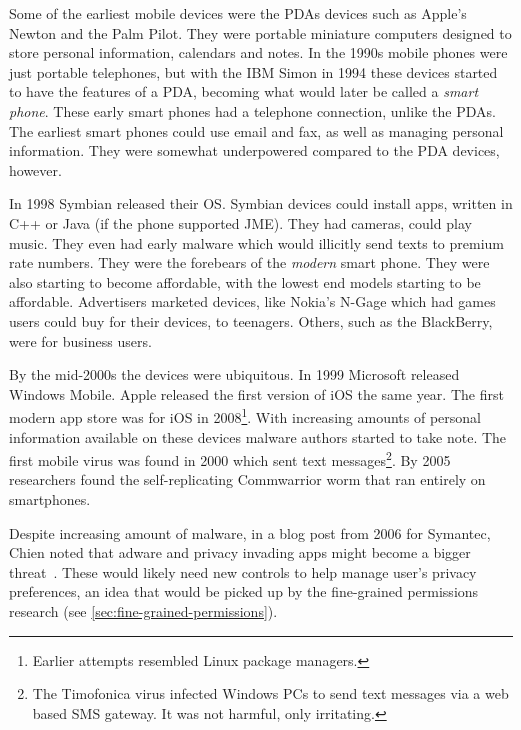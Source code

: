 \documentclass[thesis.tex]{subfiles}
\begin{document}
Some of the earliest mobile devices were the \acp{PDA} devices such as Apple's
Newton and the Palm Pilot. They were portable miniature computers designed to
store personal information, calendars and notes.  In the 1990s mobile phones were just portable
telephones, but with the IBM Simon in 1994 these devices started to have the features of a \ac{PDA}, becoming what would later be called a
\emph{smart phone}. These early smart phones had a telephone connection, unlike
the \acp{PDA}. The earliest smart phones could use email and fax, as well as
managing personal information. They were somewhat underpowered compared to the
\ac{PDA} devices, however.

In 1998 Symbian released their OS. Symbian devices could install apps, written
in C++ or Java (if the phone supported JME). They had cameras, could play music.
They even had early malware which would illicitly send texts to premium rate
numbers. They were the forebears of the \emph{modern} smart phone. They were
also starting to become affordable, with the lowest end models starting to be
affordable. Advertisers marketed devices, like Nokia's N-Gage which had games users could buy for their devices, to
teenagers. Others, such as
the BlackBerry, were for business users.

By the mid-2000s the devices were ubiquitous. In 1999 Microsoft released Windows Mobile. Apple released the first version of iOS the same year. 
The first modern app store was for iOS in
2008\footnote{Earlier attempts resembled Linux package managers.}.
With increasing amounts of personal information available on these devices
malware authors started to take note. The first mobile virus was found in 2000
which sent text messages\footnote{The Timofonica virus infected Windows PCs to
send text messages via a web based SMS gateway. It was not harmful, only
irritating.}. By 2005 researchers found the self-replicating Commwarrior worm that ran entirely on smartphones.

Despite increasing amount of malware, in a blog post from 2006 for Symantec,
Chien noted that adware and privacy invading apps might become a bigger
threat~\cite{eric_chien_spyware_2006}. These would likely need new controls to
help manage user's privacy preferences, an idea that would be picked up by the
fine-grained permissions research (see \autoref{sec:fine-grained-permissions}).
\end{document}
